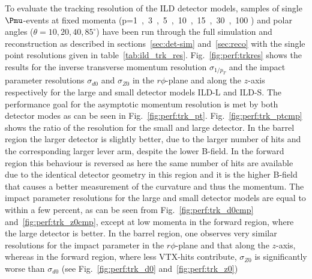 To evaluate the tracking resolution of the ILD detector models, samples of single $\Pmu$-events at fixed
momenta (p=\unit{1,3,5,10,15,30,100}{\GeV} ) and polar angles ($\theta=10,20,40,85^\circ$) have been
run through the full simulation and reconstruction as described in
sections~\ref{sec:det-sim} and~\ref{sec:reco} with the single point resolutions given in table~\ref{tab:ild_trk_res}.
Fig.~\ref{fig:perf:trkres} shows the results for the inverse transverse momentum resolution
$\sigma_{1/p_T}$ and the impact parameter resolutions $\sigma_{d0}$ and $\sigma_{Z0}$ in the 
$r\phi$-plane and along the $z$-axis respectively for the large and small detector models ILD-L and ILD-S.
The performance goal for the asymptotic momentum resolution is met by both detector modes as can be seen in
Fig.~\ref{fig:perf:trk_pt}. Fig.~\ref{fig:perf:trk_ptcmp} shows the ratio of the resolution for the small
and large detector. In the barrel region the larger detector is slightly better, due to the larger number of hits and
the corresponding larger lever arm, despite the lower B-field. In the forward region this behaviour
is reversed as here the same number of hits are available due to the identical detector geometry in this region
and it is the higher B-field that causes a better measurement of the curvature and thus the momentum.
The impact parameter resolutions for the large and small detector models are equal to within a few percent,
as can be seen from Fig.~\ref{fig:perf:trk_d0cmp} and~\ref{fig:perf:trk_z0cmp}, except at low momenta in the
forward region, where the large detector is better.
In the barrel region, one observes very similar resolutions for the impact parameter in the $r\phi$-plane
and that along the $z$-axis, whereas in the forward region, where less VTX-hits contribute, $\sigma_{Z0}$
is significantly worse than  $\sigma_{d0}$ (see Fig.~\ref{fig:perf:trk_d0} and~\ref{fig:perf:trk_z0})
%
% 
